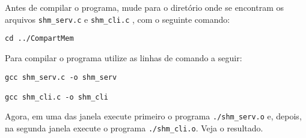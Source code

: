 Antes de compilar o programa, mude para o diretório onde se encontram os arquivos \texttt{shm\_serv.c} e \texttt{shm\_cli.c} , com o seguinte comando:
\begin{lstlisting}[style=MyBashStyle]
cd ../CompartMem
\end{lstlisting}


Para compilar o programa utilize as linhas de comando a seguir:
\begin{lstlisting}[style=MyBashStyle]
gcc shm_serv.c -o shm_serv

gcc shm_cli.c -o shm_cli
\end{lstlisting}

Agora, em uma das janela execute primeiro o programa \texttt{./shm\_serv.o} e, depois, na segunda janela execute o programa \texttt{./shm\_cli.o}. Veja o resultado.